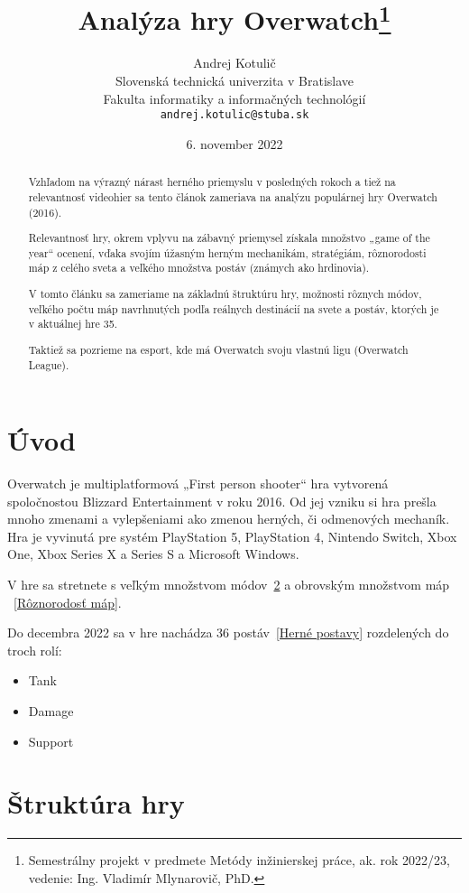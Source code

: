 \documentclass[10pt,oneside,slovak,a4paper]{article}
\title{Analýza hry Overwatch\thanks{Semestrálny projekt v predmete Metódy inžinierskej práce, ak. rok 2022/23, vedenie: Ing. Vladimír Mlynarovič, PhD.}} %
\author{Andrej Kotulič\\[2pt]
	{\small Slovenská technická univerzita v Bratislave}\\
	{\small Fakulta informatiky a informačných technológií}\\
	{\small \texttt{andrej.kotulic@stuba.sk}}
	}
\date{\small 6. november 2022} %
\begin{document}
\maketitle

\begin{abstract}
Vzhľadom na výrazný nárast herného priemyslu v posledných rokoch a tiež na relevantnosť videohier sa tento článok zameriava na analýzu populárnej hry Overwatch (2016). 

Relevantnosť hry, okrem vplyvu na zábavný priemysel získala množstvo „game of the year“ ocenení, vďaka svojím úžasným herným mechanikám, stratégiám, rôznorodosti máp z celého sveta a veľkého množstva postáv (známych ako hrdinovia).

V tomto článku sa zameriame na základnú štruktúru hry, možnosti rôznych módov, veľkého počtu máp navrhnutých podľa reálnych destinácií na svete a postáv, ktorých je v aktuálnej hre 35. 

Taktiež sa pozrieme na esport, kde má Overwatch svoju vlastnú ligu (Overwatch League).
\end{abstract}



\section{Úvod}

Overwatch je multiplatformová „First person shooter“ hra vytvorená spoločnostou Blizzard Entertainment  v roku 2016.
Od jej vzniku si hra prešla mnoho zmenami a vylepšeniami ako zmenou herných, či odmenových mechaník.
Hra je vyvinutá pre systém PlayStation 5, PlayStation 4, Nintendo Switch, Xbox One, Xbox Series X a Series S a Microsoft Windows.

V hre sa stretnete s veľkým množstvom módov~\ref{Herné mechaniky} a obrovským množstvom máp ~\ref{Rôznorodosť máp}.

Do decembra 2022 sa v hre nachádza 36 postáv~\ref{Herné postavy} rozdelených do troch rolí:
\begin{itemize}
\item Tank
\item Damage
\item Support
\end{itemize}


\section{Štruktúra hry} \label{Herné mechaniky}
\end{document}
